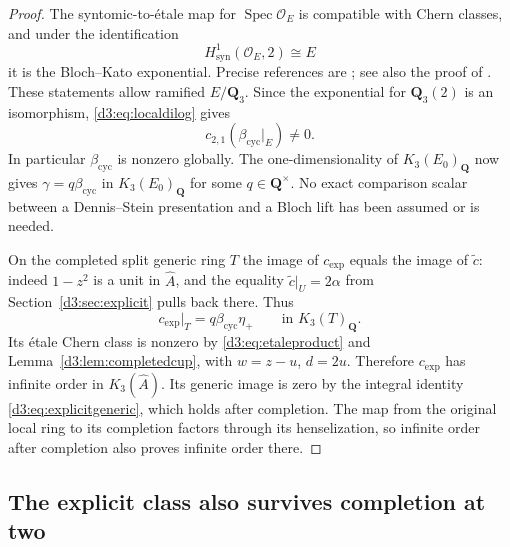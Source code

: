 \documentclass[11pt,a4paper]{amsart}
\numberwithin{equation}{section}
\theoremstyle{definition}
\theoremstyle{remark}
\newcommand{\Q}{\mathbf Q}
\newcommand{\OO}{\mathcal O}
\newcommand{\Spec}{\operatorname{Spec}}
\begin{document}
\begin{proof}
The syntomic-to-\'etale map for $\Spec\OO_E$ is compatible with Chern classes, and under the identification
\[ H^1_{\mathrm{syn}}(\OO_E,2)\cong E \]
it is the Bloch--Kato exponential. Precise references are \cite[Example~2.2.4 and Propositions~2.2.7, 2.2.9, 2.3.4]{HuberKings}; see also the proof of \cite[Corollary~5.19]{Tamme}. These statements allow ramified $E/\Q_3$. Since the exponential for $\Q_3(2)$ is an isomorphism, \eqref{d3:eq:localdilog} gives
\[
c_{2,1}(\beta_{\mathrm{cyc}}|_E)\ne0.
\]
In particular $\beta_{\mathrm{cyc}}$ is nonzero globally. The one-dimensionality of $K_3(E_0)_{\Q}$ now gives $\gamma=q\beta_{\mathrm{cyc}}$ in $K_3(E_0)_{\Q}$ for some $q\in\Q^\times$. No exact comparison scalar between a Dennis--Stein presentation and a Bloch lift has been assumed or is needed.

On the completed split generic ring $T$ the image of $c_{\mathrm{exp}}$ equals the image of $\widetilde c$: indeed $1-z^2$ is a unit in $\widehat A$, and the equality $\widetilde c|_U=2\alpha$ from Section~\ref{d3:sec:explicit} pulls back there. Thus
\[
c_{\mathrm{exp}}|_T=q\beta_{\mathrm{cyc}}\eta_+\qquad\text{in }K_3(T)_{\Q}.
\]
Its \'etale Chern class is nonzero by \eqref{d3:eq:etaleproduct} and Lemma~\ref{d3:lem:completedcup}, with $w=z-u$, $d=2u$. Therefore $c_{\mathrm{exp}}$ has infinite order in $K_3(\widehat A)$. Its generic image is zero by the integral identity \eqref{d3:eq:explicitgeneric}, which holds after completion. The map from the original local ring to its completion factors through its henselization, so infinite order after completion also proves infinite order there.
\end{proof}

\subsection{The explicit class also survives completion at two}
\label{d3:sec:explicittwocomplete}
\end{document}
